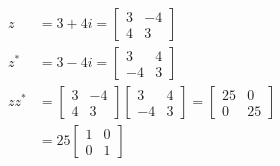 $$
  \begin{aligned}
    z       & =3+4 i=\left[\begin{array}{cc}
        3 & -4 \\
        4 & 3
      \end{array}\right]                                                                          \\
    z^{*}   & =3-4 i=\left[\begin{array}{cc}
        3  & 4 \\
        -4 & 3
      \end{array}\right]                                                                          \\
    z z^{*} & =\left[\begin{array}{cc}
        3 & -4 \\
        4 & 3
      \end{array}\right]\left[\begin{array}{cc}
        3  & 4 \\
        -4 & 3
      \end{array}\right]=\left[\begin{array}{cc}
        25 & 0  \\
        0  & 25
      \end{array}\right] \\
            & =25\left[\begin{array}{cc}
        1 & 0 \\
        0 & 1
      \end{array}\right]
  \end{aligned}
$$

